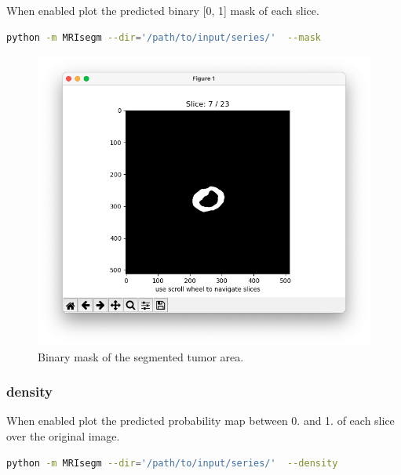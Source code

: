 \documentclass{standalone}
\begin{document}
When enabled plot the predicted binary [0, 1] mask of each slice.

\begin{lstlisting}[language = bash]
python -m MRIsegm --dir='/path/to/input/series/'  --mask
\end{lstlisting}

\begin{figure}[ht]

    \centering
    \includegraphics[width=\textwidth]{../images/example_mask.png}

    \caption{Binary mask of the segmented tumor area.}
    \label{mask}
    
\end{figure}
\newpage

\subsubsection{density}

When enabled plot the predicted probability map between 0. and 1. of each slice over the original image.

\begin{lstlisting}[language = bash]
python -m MRIsegm --dir='/path/to/input/series/'  --density
\end{lstlisting}
\end{document}
